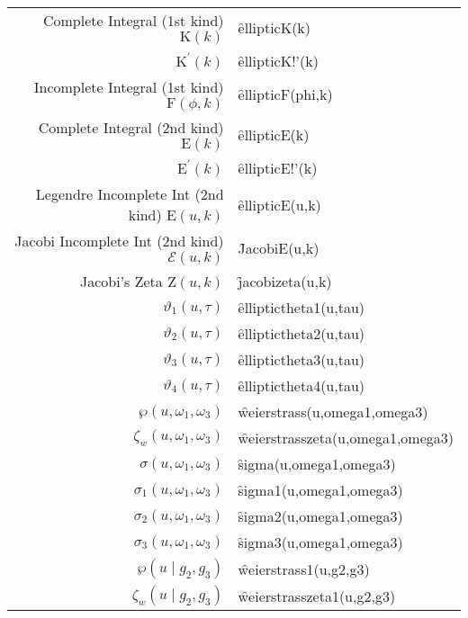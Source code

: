 {\begin{tabular}{r l}
Complete Integral (1st kind) $\mathrm{K}(k)$ & \f{ellipticK(k)}\\
$\mathrm{K}^\prime(k)$ & \f{ellipticK!'(k)}\\
Incomplete Integral (1st kind) $\mathrm{F}(\phi,k)$ & \f{ellipticF(phi,k)}\\
Complete Integral (2nd kind) $\mathrm{E}(k)$ & \f{ellipticE(k)}\\
$\mathrm{E}^\prime(k)$ & \f{ellipticE!'(k)}\\
Legendre Incomplete Int (2nd kind) $\mathrm{E}(u,k)$ & \f{ellipticE(u,k)}\\
Jacobi Incomplete Int (2nd kind) $\mathcal{E}(u,k)$ & \f{JacobiE(u,k)}\\
Jacobi's Zeta $\mathrm{Z}(u,k)$ & \f{jacobizeta(u,k)}\\
$\vartheta_1(u,\tau)$ & \f{elliptictheta1(u,tau)}\\
$\vartheta_2(u,\tau)$ & \f{elliptictheta2(u,tau)}\\
$\vartheta_3(u,\tau)$ & \f{elliptictheta3(u,tau)}\\
$\vartheta_4(u,\tau)$ & \f{elliptictheta4(u,tau)}\\
$\wp(u,\omega_1, \omega_3)$ & \f{weierstrass(u,omega1,omega3)}\\
$\zeta_w(u,\omega_1, \omega_3)$ & \f{weierstrasszeta(u,omega1,omega3)}\\
$\sigma(u,\omega_1, \omega_3)$ & \f{sigma(u,omega1,omega3)}\\
$\sigma_1(u,\omega_1, \omega_3)$ & \f{sigma1(u,omega1,omega3)}\\
$\sigma_2(u,\omega_1, \omega_3)$ & \f{sigma2(u,omega1,omega3)}\\
$\sigma_3(u,\omega_1, \omega_3)$ & \f{sigma3(u,omega1,omega3)}\\
$\wp(u \mid g_2, g_3)$ & \f{weierstrass1(u,g2,g3)}\\
$\zeta_w(u \mid g_2, g_3)$ & \f{weierstrasszeta1(u,g2,g3)}\\[5pt]
\end{tabular}}
